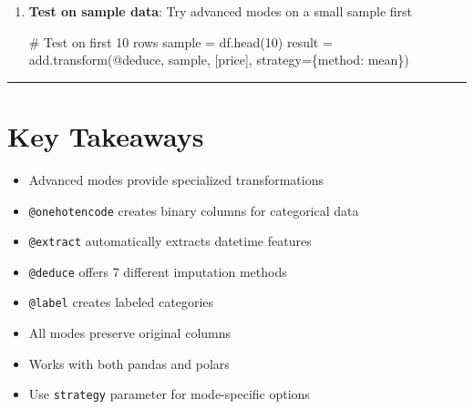 \documentclass[
  letterpaper,
]{scrbook}
\newenvironment{Shaded}{\begin{snugshade}}{\end{snugshade}}
\newcommand{\CommentTok}[1]{\textcolor[rgb]{0.37,0.37,0.37}{#1}}
\newcommand{\DecValTok}[1]{\textcolor[rgb]{0.68,0.00,0.00}{#1}}
\newcommand{\NormalTok}[1]{\textcolor[rgb]{0.00,0.23,0.31}{#1}}
\newcommand{\OperatorTok}[1]{\textcolor[rgb]{0.37,0.37,0.37}{#1}}
\newcommand{\StringTok}[1]{\textcolor[rgb]{0.13,0.47,0.30}{#1}}
\providecommand{\tightlist}{%
  \setlength{\itemsep}{0pt}\setlength{\parskip}{0pt}}
\begin{document}
\begin{enumerate}
\begin{Shaded}
\begin{Highlighting}[]
\CommentTok{\# Then encode}
\NormalTok{result }\OperatorTok{=}\NormalTok{ add.transform(}\StringTok{\textquotesingle{}@onehotencode\textquotesingle{}}\NormalTok{, df, [}\StringTok{\textquotesingle{}category\textquotesingle{}}\NormalTok{])}
\end{Highlighting}
\end{Shaded}
\item
  \textbf{Test on sample data}: Try advanced modes on a small sample
  first

\begin{Shaded}
\begin{Highlighting}[]
\CommentTok{\# Test on first 10 rows}
\NormalTok{sample }\OperatorTok{=}\NormalTok{ df.head(}\DecValTok{10}\NormalTok{)}
\NormalTok{result }\OperatorTok{=}\NormalTok{ add.transform(}\StringTok{\textquotesingle{}@deduce\textquotesingle{}}\NormalTok{, sample, [}\StringTok{\textquotesingle{}price\textquotesingle{}}\NormalTok{], strategy}\OperatorTok{=}\NormalTok{\{}\StringTok{\textquotesingle{}method\textquotesingle{}}\NormalTok{: }\StringTok{\textquotesingle{}mean\textquotesingle{}}\NormalTok{\})}
\end{Highlighting}
\end{Shaded}
\end{enumerate}

\begin{center}\rule{0.5\linewidth}{0.5pt}\end{center}

\section{Key Takeaways}\label{key-takeaways-8}

\begin{itemize}
\tightlist
\item
  Advanced modes provide specialized transformations
\item
  \texttt{@onehotencode} creates binary columns for categorical data
\item
  \texttt{@extract} automatically extracts datetime features
\item
  \texttt{@deduce} offers 7 different imputation methods
\item
  \texttt{@label} creates labeled categories
\item
  All modes preserve original columns
\item
  Works with both pandas and polars
\item
  Use \texttt{strategy} parameter for mode-specific options
\end{itemize}
\end{document}
